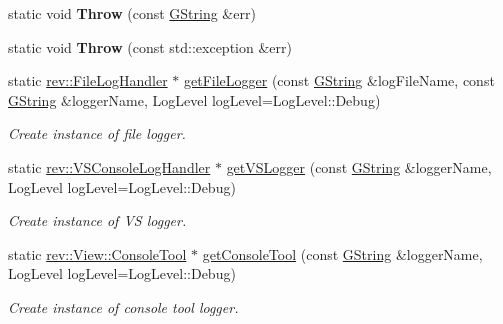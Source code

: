 \begin{Indent}
\begin{DoxyCompactItemize}
static void {\bfseries Throw} (const \mbox{\hyperlink{classrev_1_1_g_string}{G\+String}} \&err)
\item 
\mbox{\label{classrev_1_1_logger_aab3d3bc741fc53e3c67c18df2d344e03}} 
static void {\bfseries Throw} (const std\+::exception \&err)
\item 
\mbox{\label{classrev_1_1_logger_af529a84d7994acfc55b78a69b5a0081c}} 
static \mbox{\hyperlink{classrev_1_1_file_log_handler}{rev\+::\+File\+Log\+Handler}} $\ast$ \mbox{\hyperlink{classrev_1_1_logger_af529a84d7994acfc55b78a69b5a0081c}{get\+File\+Logger}} (const \mbox{\hyperlink{classrev_1_1_g_string}{G\+String}} \&log\+File\+Name, const \mbox{\hyperlink{classrev_1_1_g_string}{G\+String}} \&logger\+Name, Log\+Level log\+Level=Log\+Level\+::\+Debug)
\begin{DoxyCompactList}\small\item\em Create instance of file logger. \end{DoxyCompactList}\item 
\mbox{\label{classrev_1_1_logger_ae3b818c5cb3f83a604989a7ce82a1ede}} 
static \mbox{\hyperlink{classrev_1_1_v_s_console_log_handler}{rev\+::\+V\+S\+Console\+Log\+Handler}} $\ast$ \mbox{\hyperlink{classrev_1_1_logger_ae3b818c5cb3f83a604989a7ce82a1ede}{get\+V\+S\+Logger}} (const \mbox{\hyperlink{classrev_1_1_g_string}{G\+String}} \&logger\+Name, Log\+Level log\+Level=Log\+Level\+::\+Debug)
\begin{DoxyCompactList}\small\item\em Create instance of VS logger. \end{DoxyCompactList}\item 
\mbox{\label{classrev_1_1_logger_aece1131f1b5468ed095de26f62329c8b}} 
static \mbox{\hyperlink{classrev_1_1_view_1_1_console_tool}{rev\+::\+View\+::\+Console\+Tool}} $\ast$ \mbox{\hyperlink{classrev_1_1_logger_aece1131f1b5468ed095de26f62329c8b}{get\+Console\+Tool}} (const \mbox{\hyperlink{classrev_1_1_g_string}{G\+String}} \&logger\+Name, Log\+Level log\+Level=Log\+Level\+::\+Debug)
\begin{DoxyCompactList}\small\item\em Create instance of console tool logger. \end{DoxyCompactList}\item 
\mbox{\label{classrev_1_1_logger_a99e447e259c0a0c97d98f7c2275ab4ae}} 

\end{DoxyCompactItemize}
\end{Indent}

